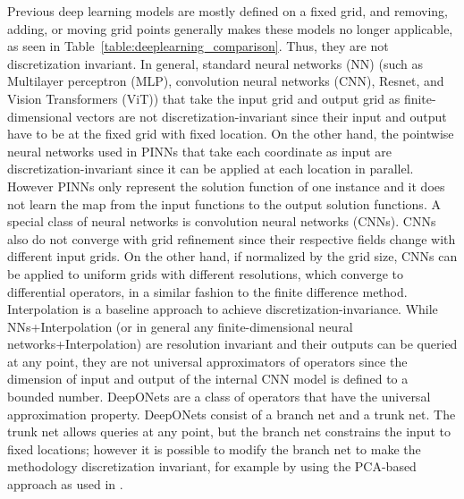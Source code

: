 Previous deep learning models are mostly defined on a fixed grid, and  removing, adding, or moving grid points generally makes these models no longer applicable, as seen in Table~\ref{table:deeplearning_comparison}. Thus, they are  not discretization invariant. 
In general, standard neural networks (NN) (such as Multilayer perceptron (MLP), convolution neural networks (CNN), 
Resnet, and Vision Transformers (ViT)) that take the input grid and output grid as finite-dimensional vectors are not discretization-invariant since their input and output have to be at the fixed grid with fixed location. 
On the other hand, the pointwise neural networks used in PINNs \citep{raissi2019physics} that take each coordinate as input are discretization-invariant since it can be applied at each location in parallel. However PINNs only represent the solution function of one instance and it does not learn the map from the input functions to the output solution functions.
A special class of neural networks is convolution neural networks (CNNs). 
CNNs also do not converge with grid refinement since their respective fields change with different input grids. On the other hand,  if normalized by the grid size, CNNs can be applied to uniform grids with different resolutions, which converge to differential operators, in a  similar fashion to the finite difference method.  Interpolation is a baseline approach to achieve discretization-invariance.
While NNs+Interpolation (or in general any finite-dimensional neural networks+Interpolation) are resolution invariant and their outputs can be queried at any point, they are not universal approximators of operators since the dimension of input and output of the internal CNN model is defined to a bounded number. 
DeepONets \citep{lu2019deeponet} are a class of operators that have the universal approximation property. DeepONets consist of a branch net and a trunk net. The trunk net allows queries at any point, but the branch net constrains the input to fixed locations; however it is possible to modify the
branch net to make the methodology discretization invariant, for example by using
the PCA-based approach as used in \citep{de2022cost}.






